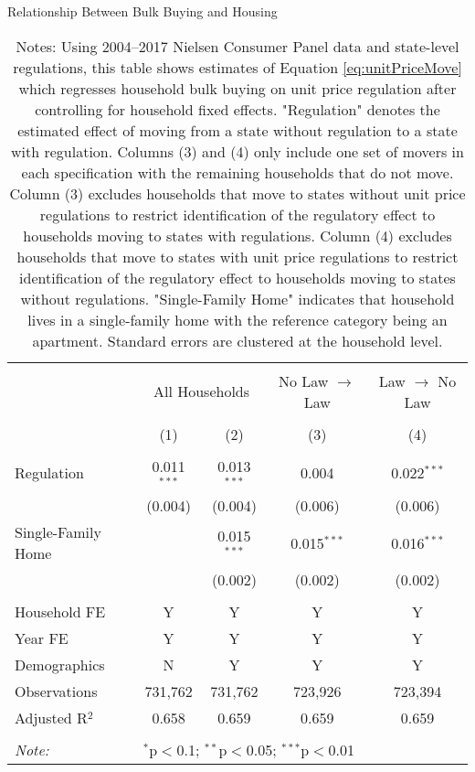 \begin{table}[!htbp] \centering
  \caption{Relationship Between Bulk Buying and Housing}
\begin{tabular}{@{\extracolsep{5pt}}lcccc}
\\[-1.8ex]\hline
\hline \\[-1.8ex]
 & \multicolumn{2}{c}{All Households} & No Law $\rightarrow$ Law & Law $\rightarrow$ No Law \\
\\[-1.8ex] & (1) & (2) & (3) & (4)\\
\hline \\[-1.8ex]
 Regulation & 0.011$^{***}$ & 0.013$^{***}$ & 0.004 & 0.022$^{***}$ \\
  & (0.004) & (0.004) & (0.006) & (0.006) \\
  Single-Family Home &  & 0.015$^{***}$ & 0.015$^{***}$ & 0.016$^{***}$ \\
  &  & (0.002) & (0.002) & (0.002) \\
 \hline \\[-1.8ex]
Household FE & Y & Y & Y & Y \\
Year FE & Y & Y & Y & Y \\
Demographics & N & Y & Y & Y \\
Observations & 731,762 & 731,762 & 723,926 & 723,394 \\
Adjusted R$^{2}$ & 0.658 & 0.659 & 0.659 & 0.659 \\
\hline
\hline \\[-1.8ex]
\textit{Note:}  & \multicolumn{4}{l}{$^{*}$p$<$0.1; $^{**}$p$<$0.05; $^{***}$p$<$0.01} \\
\end{tabular}
\caption*{Notes: Using 2004--2017 Nielsen Consumer Panel data and state-level regulations, this table shows estimates of Equation \ref{eq:unitPriceMove} which regresses household bulk buying on unit price regulation after controlling for household fixed effects. "Regulation" denotes the estimated effect of moving from a state without regulation to a state with regulation. Columns (3) and (4) only include one set of movers in each specification with the remaining households that do not move. Column (3) excludes households that move to states without unit price regulations to restrict identification of the regulatory effect to households moving to states with regulations. Column (4) excludes households that move to states with unit price regulations to restrict identification of the regulatory effect to households moving to states without regulations. "Single-Family Home" indicates that household lives in a single-family home with the reference category being an apartment. Standard errors are clustered at the household level.}
\end{table}
